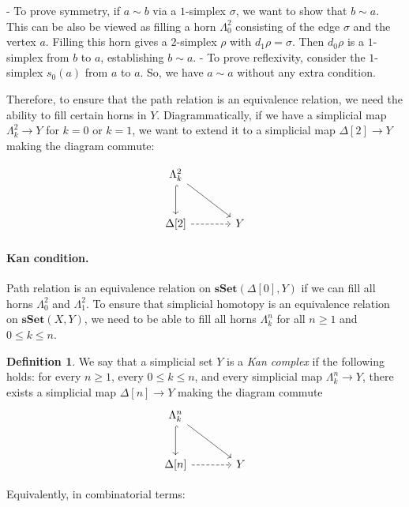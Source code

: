 \documentclass[11pt]{article}
\theoremstyle{definition}
\newtheorem{definition}{Definition}[section]
\theoremstyle{plain}
\begin{document}
- To prove symmetry, if $a \sim b$ via a $1$-simplex $\sigma$, we want to show that $b \sim a$. This can be also be viewed as filling a horn $\Lambda^2_0$ consisting of the edge $\sigma$ and the vertex $a$. Filling this horn gives a $2$-simplex $\rho$ with $d_1\rho = \sigma$. Then $d_0\rho$ is a $1$-simplex from $b$ to $a$, establishing $b \sim a$.
- To prove reflexivity, consider the $1$-simplex $s_0(a)$ from $a$ to $a$. So, we have $a \sim a$ without any extra condition.


Therefore, to ensure that the path relation is an equivalence relation, we need the ability to fill certain horns in $Y$.
Diagrammatically, if we have a simplicial map $\Lambda^2_k \to Y$ for $k=0$ or $k=1$, we want to extend it to a simplicial map $\Delta[2] \to Y$ making the diagram commute:


\[
    \begin{tikzcd}[row sep=large, column sep=large]
        \Lambda^2_k \arrow[d,hook] \arrow[dr] & \\
        \Delta[2] \arrow[r,dashed] & Y
    \end{tikzcd}
\]

\paragraph{Kan condition.}

Path relation is an equivalence relation on $\mathbf{sSet}(\Delta[0],Y)$ if we can fill all horns $\Lambda^2_0$ and $\Lambda^2_1$.
To ensure that simplicial homotopy is an equivalence relation on $\mathbf{sSet}(X,Y)$, we need to be able to fill all horns $\Lambda^n_k$ for all $n \geq 1$ and $0 \leq k \leq n$.



\begin{definition}
    We say that a simplicial set $Y$ is a \emph{Kan complex} if the following holds:
    for every $n \geq 1$, every $0 \leq k \leq n$, and every simplicial map $\Lambda^n_k \to Y$, there exists a simplicial map $\Delta[n] \to Y$ making the diagram commute
    \[
        \begin{tikzcd}[row sep=large, column sep=large]
            \Lambda^n_k \arrow[d,hook] \arrow[dr] & \\
            \Delta[n] \arrow[r,dashed] & Y
        \end{tikzcd}
    \]
\end{definition}



Equivalently, in combinatorial terms:
\end{document}
